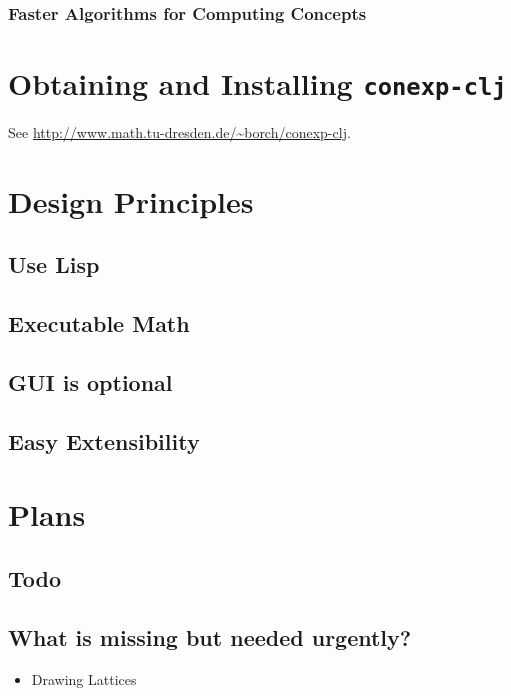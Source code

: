 \documentclass{scrbook}
\newcommand{\conexpclj}{\texttt{conexp-clj}}
\theoremstyle{plain}
\theoremstyle{plain}
\theoremstyle{plain}
\theoremstyle{nonumberplain}
\begin{document}
\subsubsection{Faster Algorithms for Computing Concepts}


\section{Obtaining and Installing \conexpclj}

See \url{http://www.math.tu-dresden.de/~borch/conexp-clj}.


\section{Design Principles}

\subsection{Use Lisp}

\subsection{Executable Math}

\subsection{GUI is optional}

\subsection{Easy Extensibility}


\section{Plans}

\subsection{Todo}

\subsection{What is missing but needed urgently?}

\begin{itemize}
\item Drawing Lattices
\end{itemize}
\end{document}

